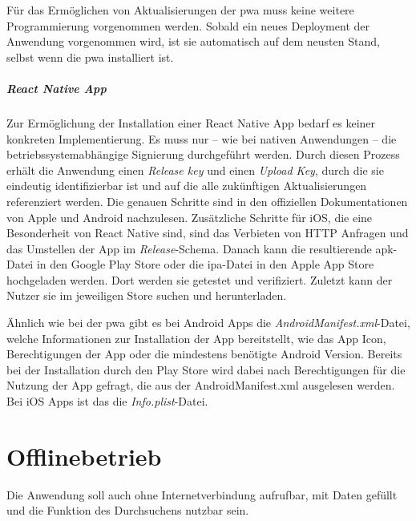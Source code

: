 Für das Ermöglichen von Aktualisierungen der \ac{pwa} muss keine weitere Programmierung vorgenommen werden.
Sobald ein neues Deployment der Anwendung vorgenommen wird, ist sie automatisch auf dem neusten Stand, selbst wenn die \ac{pwa} installiert ist.

\subparagraph{React Native App\\}
Zur Ermöglichung der Installation einer React Native App bedarf es keiner konkreten Implementierung.
Es muss nur  -- wie bei nativen Anwendungen -- die betriebssystemabhängige Signierung durchgeführt werden.
Durch diesen Prozess erhält die Anwendung einen \textit{Release key} und einen \textit{Upload Key}, durch die sie eindeutig identifizierbar ist und auf die alle zukünftigen Aktualisierungen referenziert werden.
Die genauen Schritte sind in den offiziellen Dokumentationen von Apple und Android nachzulesen.
Zusätzliche Schritte für iOS, die eine Besonderheit von React Native sind, sind das Verbieten von HTTP Anfragen und das Umstellen der App im \textit{Release}-Schema.
Danach kann die resultierende \ac{apk}-Datei in den Google Play Store oder die \ac{ipa}-Datei in den Apple App Store hochgeladen werden.
Dort werden sie getestet und verifiziert.
Zuletzt kann der Nutzer sie im jeweiligen Store suchen und herunterladen.

Ähnlich wie bei der \ac{pwa} gibt es bei Android Apps die \textit{AndroidManifest.xml}-Datei, welche Informationen zur Installation der App bereitstellt, wie das App Icon, Berechtigungen der App oder die mindestens benötigte Android Version.
Bereits bei der Installation durch den Play Store wird dabei nach Berechtigungen für die Nutzung der App gefragt, die aus der AndroidManifest.xml ausgelesen werden.
Bei iOS Apps ist das die \textit{Info.plist}-Datei.

\section{Offlinebetrieb}

Die Anwendung soll auch ohne Internetverbindung aufrufbar, mit Daten gefüllt und die Funktion des Durchsuchens nutzbar sein.

